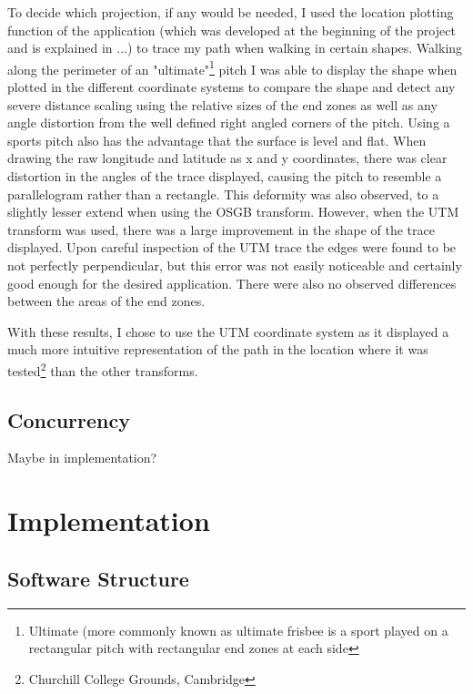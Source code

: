 To decide which projection, if any would be needed, I used the location plotting function of the application (which was developed at the beginning of the project and is explained in ...) to trace my path when walking in certain shapes.
Walking along the perimeter of an "ultimate"\footnote{Ultimate (more commonly known as ultimate frisbee is a sport played on a rectangular pitch with rectangular end zones at each side} pitch I was able to display the shape when plotted in the different coordinate systems to compare the shape and detect any severe distance scaling using the relative sizes of the end zones as well as any angle distortion from the well defined right angled corners of the pitch. Using a sports pitch also has the advantage that the surface is level and flat.
When drawing the raw longitude and latitude as x and y coordinates, there was clear distortion in the angles of the trace displayed, causing the pitch to resemble a parallelogram rather than a rectangle. This deformity was also observed, to a slightly lesser extend when using the OSGB transform. However, when the UTM transform was used, there was a large improvement in the shape of the trace displayed. Upon careful inspection of the UTM trace the edges were found to be not perfectly perpendicular, but this error was not easily noticeable and certainly good enough for the desired application. There were also no observed differences between the areas of the end zones.

With these results, I chose to use the UTM coordinate system as it displayed a much more intuitive representation of the path in the location where it was tested\footnote{Churchill College Grounds, Cambridge} than the other transforms.

\section{Concurrency}

Maybe in implementation?

\cleardoublepage
\chapter{Implementation}

\section{Software Structure}

